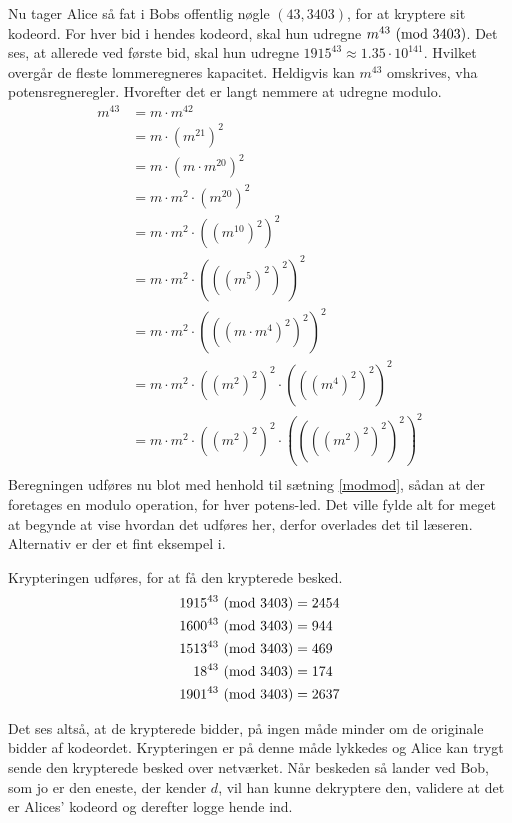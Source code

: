 Nu tager Alice så fat i Bobs offentlig nøgle \((43, 3403)\), for at kryptere sit kodeord.
For hver bid i hendes kodeord, skal hun udregne \(m^{43} \ (\mathrm{mod}\ 3403)\).
Det ses, at allerede ved første bid, skal hun udregne \(1915^{43} \approx 1.35 \cdot 10^{141}\).
Hvilket overgår de fleste lommeregneres kapacitet.
Heldigvis kan \(m^{43}\) omskrives, vha potensregneregler. Hvorefter det er langt nemmere at udregne modulo.
\begin{align*}
m^{43} &= m \cdot m^{42}\\
       &= m \cdot (m^{21})^2\\
       &= m \cdot (m \cdot m^{20})^2\\
       &= m \cdot m^2 \cdot (m^{20})^2\\
       &= m \cdot m^2 \cdot ((m^{10})^2)^2\\
       &= m \cdot m^2 \cdot (((m^5)^2)^2)^2\\
       &= m \cdot m^2 \cdot (((m \cdot m^4)^2)^2)^2\\
       &= m \cdot m^2 \cdot ((m^2)^2)^2 \cdot (((m^4)^2)^2)^2\\
       &= m \cdot m^2 \cdot ((m^2)^2)^2 \cdot ((((m^2)^2)^2)^2)^2\\
\end{align*}
Beregningen udføres nu blot med henhold til sætning \ref{modmod}, sådan at der foretages en modulo operation, for hver potens-led.
Det ville fylde alt for meget at begynde at vise hvordan det udføres her, derfor overlades det til læseren. Alternativ er der et fint eksempel i. \cite[104]{krypto}
\par
Krypteringen udføres, for at få den krypterede besked.
\begin{align*}
    1915^{43} \ (\mathrm{mod}\ 3403) &= 2454\\
    1600^{43} \ (\mathrm{mod}\ 3403) &= 944\\
    1513^{43} \ (\mathrm{mod}\ 3403) &= 469\\
    18^{43} \ (\mathrm{mod}\ 3403)   &= 174\\
    1901^{43} \ (\mathrm{mod}\ 3403) &= 2637\\
\end{align*}

Det ses altså, at de krypterede bidder, på ingen måde minder om de originale bidder af kodeordet.
Krypteringen er på denne måde lykkedes og Alice kan trygt sende den krypterede besked over netværket.
Når beskeden så lander ved Bob, som jo er den eneste, der kender \(d\), vil han kunne dekryptere den, validere at det er Alices' kodeord og derefter logge hende ind.

